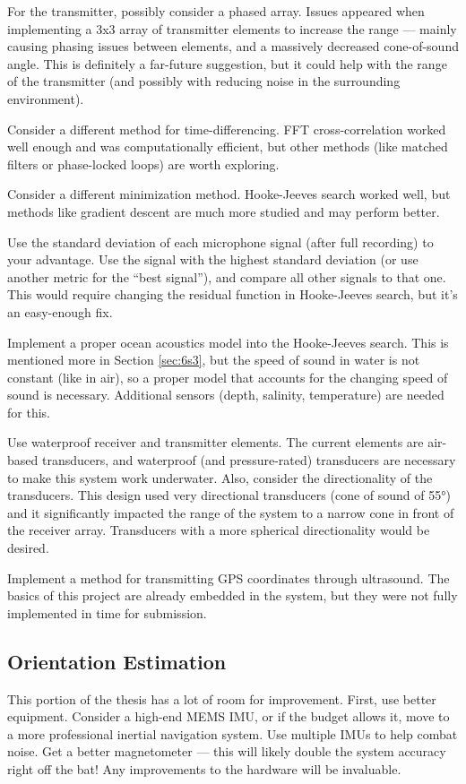 \documentclass[11pt]{ucthesisCP}
\begin{document}
For the transmitter, possibly consider a phased array. Issues appeared when implementing a 3x3 array of transmitter elements to increase the range --- mainly causing phasing issues between elements, and a massively decreased cone-of-sound angle. This is definitely a far-future suggestion, but it could help with the range of the transmitter (and possibly with reducing noise in the surrounding environment).

Consider a different method for time-differencing. FFT cross-correlation worked well enough and was computationally efficient, but other methods (like matched filters or phase-locked loops) are worth exploring.

Consider a different minimization method. Hooke-Jeeves search worked well, but methods like gradient descent are much more studied and may perform better.

Use the standard deviation of each microphone signal (after full recording) to your advantage. Use the signal with the highest standard deviation (or use another metric for the “best signal”), and compare all other signals to that one. This would require changing the residual function in Hooke-Jeeves search, but it’s an easy-enough fix.

Implement a proper ocean acoustics model into the Hooke-Jeeves search. This is mentioned more in Section \ref{sec:6s3}, but the speed of sound in water is not constant (like in air), so a proper model that accounts for the changing speed of sound is necessary. Additional sensors (depth, salinity, temperature) are needed for this.

Use waterproof receiver and transmitter elements. The current elements are air-based transducers, and waterproof (and pressure-rated) transducers are necessary to make this system work underwater. Also, consider the directionality of the transducers. This design used very directional transducers (cone of sound of 55°) and it significantly impacted the range of the system to a narrow cone in front of the receiver array. Transducers with a more spherical directionality would be desired.

Implement a method for transmitting GPS coordinates through ultrasound. The basics of this project are already embedded in the system, but they were not fully implemented in time for submission.

\subsection{Orientation Estimation} \label{sec:7s1s4}
This portion of the thesis has a lot of room for improvement. First, use better equipment. Consider a high-end MEMS IMU, or if the budget allows it, move to a more professional inertial navigation system. Use multiple IMUs to help combat noise. Get a better magnetometer --- this will likely double the system accuracy right off the bat! Any improvements to the hardware will be invaluable.
\end{document}
